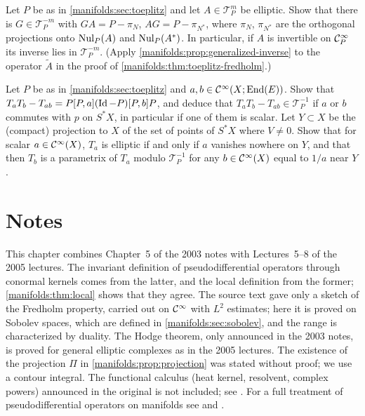 \begin{exercise}\label{manifolds:ex:toeplitz-inverse}
Let $P$ be as in \cref{manifolds:sec:toeplitz} and let $A\in\mathcal T^m_P$ be elliptic. Show that
there is $G\in\mathcal T^{-m}_P$ with $GA=P-\pi_N$, $AG=P-\pi_{N^*}$, where $\pi_N$, $\pi_{N^*}$ are
the orthogonal projections onto $\operatorname{Nul}_P(A)$ and $\operatorname{Nul}_P(A^*)$. In particular, if $A$ is
invertible on $\mathcal{C}^\infty_P$ its inverse lies in $\mathcal T^{-m}_P$. (Apply
\cref{manifolds:prop:generalized-inverse} to the operator $\tilde A$ in the proof of
\cref{manifolds:thm:toeplitz-fredholm}.)
\end{exercise}

\begin{exercise}\label{manifolds:ex:toeplitz-commutator}
Let $P$ be as in \cref{manifolds:sec:toeplitz} and $a,b\in\mathcal{C}^\infty(X;\operatorname{End}(E))$. Show that
$T_aT_b-T_{ab}=P[P,a](\operatorname{Id}-P)[P,b]P$, and deduce that $T_aT_b-T_{ab}\in\mathcal T^{-1}_P$ if
$a$ or $b$ commutes with $p$ on $S^*X$, in particular if one of them is scalar. Let
$Y\subset X$ be the (compact) projection to $X$ of the set of points of $S^*X$ where
$V\ne0$. Show that for scalar $a\in\mathcal{C}^\infty(X)$, $T_a$ is elliptic if and only if $a$ vanishes
nowhere on $Y$, and that then $T_b$ is a parametrix of $T_a$ modulo $\mathcal T^{-1}_P$ for any
$b\in\mathcal{C}^\infty(X)$ equal to $1/a$ near $Y$.
\end{exercise}

\section*{Notes}
This chapter combines Chapter~5 of the 2003 notes with Lectures~5--8 of the 2005
lectures. The invariant definition of pseudodifferential operators through
conormal kernels comes from the latter, and the local definition from the
former; \cref{manifolds:thm:local} shows that they agree. The source text gave
only a sketch of the Fredholm property, carried out on $\mathcal{C}^\infty$ with $L^2$
estimates; here it is proved on Sobolev spaces, which are defined in
\cref{manifolds:sec:sobolev}, and the range is characterized by duality. The Hodge
theorem, only announced in the 2003 notes, is proved for general elliptic
complexes as in the 2005 lectures. The existence of the projection $\Pi$ in
\cref{manifolds:prop:projection} was stated without proof; we use a contour integral.
The functional calculus (heat kernel, resolvent, complex powers) announced in the
original is not included; see \cite{Seeley,Shubin}. For a full treatment of
pseudodifferential operators on manifolds see \cite[Chapter~18]{Hormander-III}
and \cite{Shubin}.

